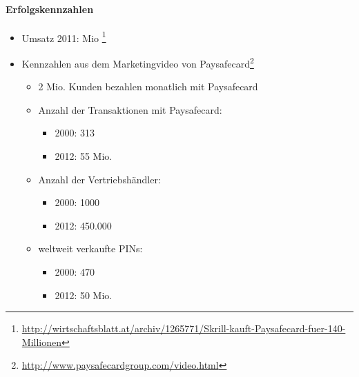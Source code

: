 \paragraph{Erfolgskennzahlen}
\begin{itemize}

	\item Umsatz 2011: Mio \footnote{\url{http://wirtschaftsblatt.at/archiv/1265771/Skrill-kauft-Paysafecard-fuer-140-Millionen}}
	\item Kennzahlen aus dem Marketingvideo von Paysafecard\footnote{\url{http://www.paysafecardgroup.com/video.html}}
	\begin{itemize}
	
	  	\item 2 Mio. Kunden bezahlen monatlich mit Paysafecard
    	\item Anzahl der Transaktionen mit Paysafecard:
    	\begin{itemize}
    	  	\item   2000: 313
    		\item   2012: 55 Mio.
    	\end{itemize}
	  
	    \item Anzahl der Vertriebshändler:
	    \begin{itemize}
	     	\item   2000: 1000
	    	\item   2012: 450.000
	    \end{itemize}
	   
	    \item weltweit verkaufte PINs:
	    \begin{itemize}
	     	\item   2000: 470 
	    	\item   2012: 50 Mio.
	    \end{itemize}
	    
	\end{itemize}
	
\end{itemize}
